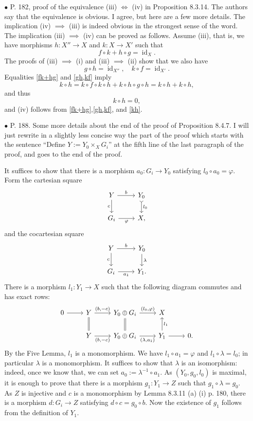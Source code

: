 \documentclass[12pt]{article}
\theoremstyle{remark}%
\newcommand{\bu}{\bullet}
\newcommand{\n}{\noindent}
\newcommand{\p}{\varphi}
\newcommand{\be}{\begin{equation}}
\newcommand{\ee}{\end{equation}}
\DeclareMathOperator{\id}{id}
\begin{document}
\n$\bu$ P. 182, proof of the equivalence (iii) $\iff$ (iv) in Proposition 8.3.14. The authors say that the equivalence is obvious. I agree, but here are a few more details. The implication (iv) $\implies$ (iii) is indeed obvious in the strongest sense of the word. The implication (iii) $\implies$ (iv) can be proved as follows. Assume (iii), that is, we have morphisms $h:X''\to X$ and $k:X\to X'$ such that 
\be\label{fk+hg} 
f\circ k+h\circ g=\id_X.
\ee 
The proofs of (iii) $\implies$ (i) and (iii) $\implies$ (ii) show that we also have 
\be\label{gh,kf} 
g\circ h=\id_{X''},\quad k\circ f=\id_{X'}.
\ee 
Equalities \eqref{fk+hg} and \eqref{gh,kf} imply 
$$
k\circ h=k\circ f\circ k\circ h+k\circ h\circ g\circ h=k\circ h+k\circ h,
$$ 
and thus 
\be\label{kh} 
k\circ h=0, 
\ee 
and (iv) follows from  \eqref{fk+hg},\eqref{gh,kf}, and \eqref{kh}. 


\n$\bu$ P. 188. Some more details about the end of the proof of Proposition 8.4.7. I will just rewrite in a slightly less concise way the part of the proof which starts with the sentence ``Define $Y:=Y_0\times_XG_i$'' at the fifth line of the last paragraph of the proof, and goes to the end of the proof. 

It suffices to show that there is a morphism $a_0:G_i\to Y_0$ satisfying $l_0\circ a_0=\p$. Form the cartesian square 
$$
\begin{tikzcd}
Y\ar{r}{b}\ar[swap]{d}{c}&Y_0\ar[tail]{d}{l_0}\\
G_i\ar[swap]{r}{\p}&X,
\end{tikzcd}
$$
and the cocartesian square 
$$
\begin{tikzcd}
Y\ar{r}{b}\ar[swap]{d}{c}&Y_0\ar{d}{\lambda}\\
G_i\ar[swap]{r}{a_1}&Y_1.
\end{tikzcd}
$$ 
There is a morphism $l_1:Y_1\to X$ such that the following diagram commutes and has exact rows: 
$$
\begin{tikzcd}
0\ar{r}&Y\ar[equal]{d}\ar{r}{(b,-c)}&Y_0\oplus G_i\ar[equal]{d}\ar{r}{(l_0,\p)}&X\\
&Y\ar{r}[swap]{(b,-c)}&Y_0\oplus G_i\ar{r}[swap]{(\lambda,a_1)}&Y_1\ar{r}\ar{u}[swap]{l_1}&0.
\end{tikzcd}
$$ 
By the Five Lemma, $l_1$ is a monomorphism. We have $l_1\circ a_1=\p$ and $l_1\circ\lambda=l_0$; in particular $\lambda$ is a monomorphism. It suffices to show that $\lambda$ is an isomorphism: indeed, once we know that, we can set $a_0:=\lambda^{-1}\circ a_1$. As $(Y_0,g_0,l_0)$ is maximal, it is enough to prove that there is a morphism $g_1:Y_1\to Z$ such that $g_1\circ\lambda=g_0$. As $Z$ is injective and $c$ is a monomorphism by Lemma 8.3.11 (a) (i) p. 180, there is a morphism $d:G_i\to Z$ satisfying $d\circ c=g_0\circ b$. Now the existence of $g_1$ follows from the definition of $Y_1$. 
\end{document}
